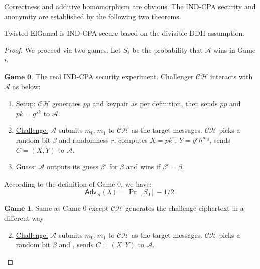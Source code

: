 \documentclass[a4paper,10pt]{article}
\begin{document}
Correctness and additive homomorphism are obvious. 
The IND-CPA security and anonymity are established by the following two theorems. 

\begin{theorem}\label{theorem:IND-CPA}
Twisted ElGamal is IND-CPA secure based on the divisible DDH assumption. 
\end{theorem}
\begin{proof}
We proceed via two games. Let $S_i$ be the probability that $\mathcal{A}$ wins in Game $i$. 
\begin{trivlist}
\item $\textbf{Game 0.}$ The real IND-CPA security experiment. 
Challenger $\mathcal{CH}$ interacts with $\mathcal{A}$ as below: 
\begin{enumerate}
\item \underline{Setup:} $\mathcal{CH}$ generates $pp$ and keypair as per definition, 
    then sends $pp$ and $pk = g^{sk}$ to $\mathcal{A}$. 

\item \underline{Challenge:} $\mathcal{A}$ submits $m_0, m_1$ to $\mathcal{CH}$ as the target messages. 
    $\mathcal{CH}$ picks a random bit $\beta$ 
    and randomness $r$, computes $X = pk^r$, $Y = g^r h^{m_\beta}$, sends $C = (X, Y)$ to $\mathcal{A}$.   

\item \underline{Guess:} $\mathcal{A}$ outputs its guess $\beta'$ for $\beta$ and wins if $\beta' = \beta$. 
\end{enumerate}

\item According to the definition of Game 0, we have: 
\begin{equation*}
    \mathsf{Adv}_\mathcal{A}(\lambda) = \Pr[S_0] - 1/2.
\end{equation*}
\end{trivlist}

\begin{trivlist}
\item $\textbf{Game 1.}$ Same as Game 0 except $\mathcal{CH}$ generates the challenge ciphertext in a different way.  

\begin{enumerate}\setcounter{enumi}{1}
\item \underline{Challenge:} $\mathcal{A}$ submits $m_0, m_1$ to $\mathcal{CH}$ as the target messages. 
    $\mathcal{CH}$ picks a random bit $\beta$ and , sends $C = (X, Y)$ to $\mathcal{A}$.   
\end{enumerate}


\end{trivlist}
\end{proof}
\end{document}
